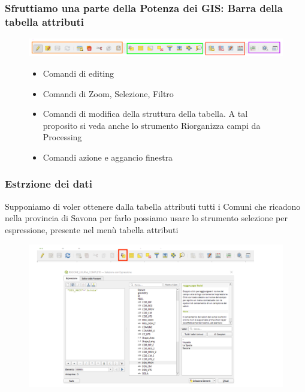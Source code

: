 \documentclass{beamer}
\begin{document}
{\begin{frame}
   \frametitle{Sfruttiamo una parte della Potenza dei GIS: Barra della tabella attributi}
   \begin{figure}
       \centering
       \includegraphics[width=1\linewidth]{Screenshot_2023_10_14-1.png}
       \begin{itemize}
          \begin{itemize}
  \item {\color{orange} Comandi di editing}
  \item {\color{green} Comandi di Zoom, Selezione, Filtro}
  \item {\color{red} Comandi di modifica della struttura della tabella. A tal proposito si veda anche lo strumento Riorganizza campi da Processing}
  \item {\color{magenta} Comandi azione e aggancio finestra}
\end{itemize}
            
           
           
       \end{itemize}
       
   \end{figure}
  
\end{frame}


 \begin{frame}
   \frametitle{Estrzione dei dati}
  Supponiamo di voler ottenere dalla tabella attributi tutti i Comuni che ricadono nella provincia di Savona per farlo possiamo usare lo strumento selezione per espressione, presente nel menù tabella attributi
  \begin{figure}
      \centering
      \includegraphics[width=0.7\linewidth]{Diapositiva1.PNG}
      
      
  \end{figure}


\end{frame}}
\end{document}
